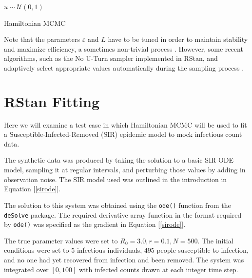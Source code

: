 \begin{algorithm}
{            \BlankLine

            $u \sim \mathcal{U}(0,1)$

            \BlankLine

        }

        \BlankLine


        \BlankLine

        \caption{Hamiltonian MCMC \label{hmcmc}}

    \end{algorithm}

    Note that the parameters $\varepsilon$ and $L$ have to be tuned in order to maintain stability and maximize efficiency, a sometimes non-trivial process \cite{Neal2011}. However, some recent algorithms, such as the No U-Turn sampler implemented in RStan, and adaptively select appropriate values automatically during the sampling process \cite{Hoffman2014}.
    

\section{RStan Fitting}

    Here we will examine a test case in which Hamiltonian MCMC will be used to fit a Susceptible-Infected-Removed (SIR) epidemic model to mock infectious count data.

    The synthetic data was produced by taking the solution to a basic SIR ODE model, sampling it at regular intervals, and perturbing those values by adding in observation noise. The SIR model used was outlined in the introduction in Equation [\ref{sirode}].

    The solution to this system was obtained using the \verb|ode()| function from the \verb|deSolve| package. The required derivative array function in the format required by \verb|ode()| was specified as the gradient in Equation [\ref{sirode}].

    The true parameter values were set to $R_0 = 3.0, r = 0.1, N = 500$. The initial conditions were set to 5 infectious individuals, 495 people susceptible to infection, and no one had yet recovered from infection and been removed. The system was integrated over $[0,100]$ with infected counts drawn at each integer time step.

